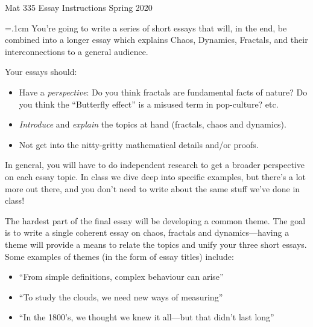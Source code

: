 \documentclass[12pt]{article}
\def\mydot{\textcolor{deepblue}{\rule{1ex}{1ex}}}
\newlength\sidebarwidth
\begin{document}
	{
		\begin{minipage}[t]{\textwidth}
			\color{myblue}\sc %
			{\huge Mat 335 Essay Instructions}
			\hfill Spring 2020

			\vspace{-8pt}
			\color{myblue}{\rule{\columnwidth}{3pt}}

			\vspace{.2cm}
		\end{minipage}
	}

	\vspace{.2cm}
	

	\small
	\hspace{\sidebarwidth}\begin{minipage}[t]{\textwidth - \sidebarwidth}
	{
		\parskip=.1cm
		You’re going to write a series of short essays that
		will, in the end, be combined into a longer essay
		which explains Chaos, Dynamics, Fractals, and their
		interconnections to a general audience.


		Your essays should:
		\vspace{-.4cm}
		\begin{itemize}[leftmargin=1cm, itemsep=0ex, parsep=.5ex, labelindent=-4ex, label={\mydot}]
			\item Have a \emph{perspective}: Do you think fractals are fundamental facts of nature? Do you think the “Butterfly effect” is a misused term in pop-culture? etc.
			\item \emph{Introduce} and \emph{explain} the topics at hand (fractals, chaos and dynamics).
			\item Not get into the nitty-gritty mathematical details and/or proofs.
		\end{itemize}
		In general, you will have to do independent research to
		get a broader perspective on each essay topic. In class we
		dive deep into specific examples, but there’s a lot more
		out there, and you don’t need to write about the same
		stuff we’ve done in class!

		The hardest part of the
		final essay will be developing a common theme. The goal
		is to write a single coherent essay on chaos, fractals
		and dynamics---having a theme will provide a means to
		relate the topics and unify your three short essays. Some
		examples of themes (in the form of essay titles) include:

		\vspace{-.3cm}
		\begin{itemize}[leftmargin=1cm, itemsep=0ex, parsep=.5ex, labelindent=-4ex, label={\mydot}]
			\item “From simple definitions, complex behaviour can arise”
			\item “To study the clouds, we need new ways of measuring”
			\item “In the 1800’s, we thought we knew it all---but that didn’t last long”
		\end{itemize}
		
}
\end{minipage}
\end{document}

